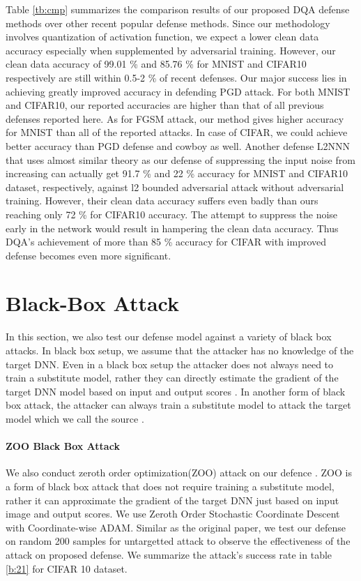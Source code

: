 \documentclass{article}
\begin{document}
Table \ref{tb:cmp} summarizes the comparison results of our proposed DQA defense methods over other recent popular defense methods. Since our methodology involves quantization of activation function, we expect a lower clean data accuracy especially when supplemented by adversarial training. However, our clean data accuracy of 99.01 \% and 85.76 \% for MNIST and CIFAR10 respectively are still within 0.5-2 \% of recent defenses. Our major success lies in achieving greatly improved accuracy in defending PGD attack. For both MNIST and CIFAR10, our reported accuracies are higher than that of all previous defenses reported here. As for FGSM attack, our method gives higher accuracy for MNIST than all of the reported attacks. In case of CIFAR, we could achieve better accuracy than PGD defense \cite{madry2017towards} and cowboy \cite{santhanam2018defending} as well. Another defense L2NNN \cite{qian2018l2} that uses almost similar theory as our defense of suppressing the input noise from increasing can actually get 91.7 \% and 22 \% accuracy for MNIST and CIFAR10 dataset, respectively, against l2 bounded adversarial attack without adversarial training. However, their clean data accuracy suffers even badly than ours reaching only 72 \% for CIFAR10 accuracy. The attempt to suppress the noise early in the network would result in hampering the clean data accuracy. Thus DQA's achievement of more than 85 \% accuracy for CIFAR with improved defense becomes even more significant.

\section{Black-Box Attack}
In this section, we also test our defense model against a variety of black box attacks. In black box setup, we assume that the attacker has no knowledge of the target DNN.
Even in a black box setup the attacker does not always need to train a substitute model, rather they can directly estimate the gradient of the target DNN model based on input and output scores \cite{chen2017zoo}.
In another form of black box attack, the attacker can always train a substitute model to attack the target model which we call the source \cite{papernot2017practical}.



\paragraph{ZOO Black Box Attack}
We also conduct zeroth order optimization(ZOO) attack on our defence \cite{chen2017zoo}. ZOO is a form of black box attack that does not require training a substitute model, rather it can approximate the gradient of the target DNN just based on input image and output scores. We use Zeroth Order Stochastic Coordinate
Descent with Coordinate-wise ADAM. Similar as the original paper, we test our defense on random 200 samples for untargetted attack to observe the effectiveness of the attack on proposed defense. We summarize the attack's success rate in table \ref{b:21} for CIFAR 10 dataset.
\end{document}
